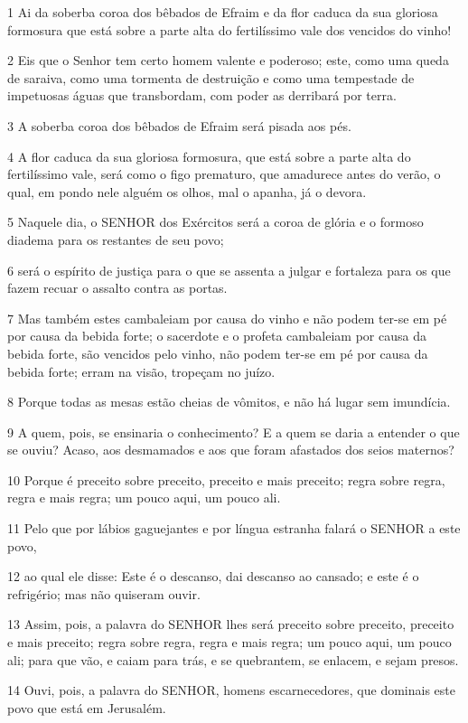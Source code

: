 \par 1 Ai da soberba coroa dos bêbados de Efraim e da flor caduca da sua gloriosa formosura que está sobre a parte alta do fertilíssimo vale dos vencidos do vinho!
\par 2 Eis que o Senhor tem certo homem valente e poderoso; este, como uma queda de saraiva, como uma tormenta de destruição e como uma tempestade de impetuosas águas que transbordam, com poder as derribará por terra.
\par 3 A soberba coroa dos bêbados de Efraim será pisada aos pés.
\par 4 A flor caduca da sua gloriosa formosura, que está sobre a parte alta do fertilíssimo vale, será como o figo prematuro, que amadurece antes do verão, o qual, em pondo nele alguém os olhos, mal o apanha, já o devora.
\par 5 Naquele dia, o SENHOR dos Exércitos será a coroa de glória e o formoso diadema para os restantes de seu povo;
\par 6 será o espírito de justiça para o que se assenta a julgar e fortaleza para os que fazem recuar o assalto contra as portas.
\par 7 Mas também estes cambaleiam por causa do vinho e não podem ter-se em pé por causa da bebida forte; o sacerdote e o profeta cambaleiam por causa da bebida forte, são vencidos pelo vinho, não podem ter-se em pé por causa da bebida forte; erram na visão, tropeçam no juízo.
\par 8 Porque todas as mesas estão cheias de vômitos, e não há lugar sem imundícia.
\par 9 A quem, pois, se ensinaria o conhecimento? E a quem se daria a entender o que se ouviu? Acaso, aos desmamados e aos que foram afastados dos seios maternos?
\par 10 Porque é preceito sobre preceito, preceito e mais preceito; regra sobre regra, regra e mais regra; um pouco aqui, um pouco ali.
\par 11 Pelo que por lábios gaguejantes e por língua estranha falará o SENHOR a este povo,
\par 12 ao qual ele disse: Este é o descanso, dai descanso ao cansado; e este é o refrigério; mas não quiseram ouvir.
\par 13 Assim, pois, a palavra do SENHOR lhes será preceito sobre preceito, preceito e mais preceito; regra sobre regra, regra e mais regra; um pouco aqui, um pouco ali; para que vão, e caiam para trás, e se quebrantem, se enlacem, e sejam presos.
\par 14 Ouvi, pois, a palavra do SENHOR, homens escarnecedores, que dominais este povo que está em Jerusalém.
